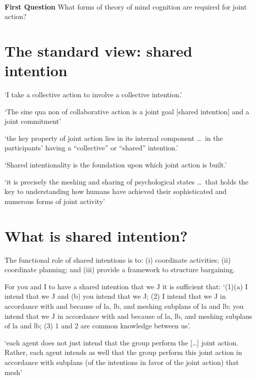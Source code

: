 \documentclass[11pt]{extarticle}
\begin{document}
\begin{multicols}{3}
\ 

{\Large
\textbf{First Question}
What forms of theory of mind cognition are required for joint action?
}


\section{The standard view: shared intention}

`I take a collective action to involve a collective intention.'  \citep%
{Gilbert:2006wr}

`The sine qua non of collaborative action is a joint goal [shared intention] and a joint commitment’ 
\citep%
{tomasello:2008origins}

`the key property of joint action lies in its internal component \ldots \ in the participants’ having a ``collective'' or ``shared'' intention.' \citep%
{alonso_shared_2009}

`Shared intentionality is the foundation upon which joint action is built.' \citep%
{Carpenter:2009wq}

`it is precisely the meshing and sharing of psychological states \ldots \ that holds the key to understanding how humans have achieved their sophisticated and numerous forms of joint activity'
\citep%
{Call:2009fk}



\section{What is shared intention?}

The functional role of shared intentions is to: 
(i) coordinate activities; (ii) coordinate planning; and (iii) provide a framework to structure bargaining.\citep%
{Bratman:1993je}

For you and I to have a shared intention that we J it is sufficient that: `(1)(a) I intend that we J and (b) you intend that we J; (2) I intend that we J in accordance with and because of la, lb, and meshing subplans of la and lb; you intend that we J in accordance with and because of la, lb, and meshing subplans of la and lb; (3) 1 and 2 are common knowledge between us'.\citep%
{Bratman:1993je}


`each agent does not just intend that the group perform the […] joint action. Rather, each agent intends as well that the group perform this joint action in accordance with subplans (of the intentions in favor of the joint action) that mesh' \citep%
{Bratman:1992mi}


\end{multicols}
\end{document}
